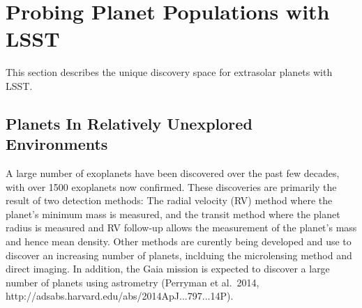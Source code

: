 
%
%
%
%
%
%

\section{Probing Planet Populations with LSST}
\def\secname{periodicvariables}\label{sec:\secname}



This section describes the unique discovery space for extrasolar planets with LSST.

\subsection{Planets In Relatively Unexplored Environments}
A large number of exoplanets have been discovered over the past few decades, with over 1500 exoplanets now confirmed. These discoveries are primarily the result of two detection methods: The radial velocity (RV) method where the planet's minimum mass is measured, and the transit method where the planet radius is measured and RV follow-up allows the measurement of the planet's mass and hence mean density. Other methods are curently being developed and use to discover an increasing number of planets, inclduing the microlensing method and direct imaging. In addition, the Gaia mission is expected to discover a large number of planets using astrometry (Perryman et al.~2014, http://adsabs.harvard.edu/abs/2014ApJ...797...14P).

